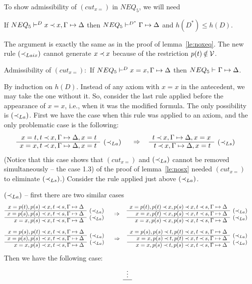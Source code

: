 \noindent
To show admissibility of $(cut_{x=})$ in $NEQ_5$, we will need
\begin{LEMMA}\label{le:xok}
If ${NEQ_5}\vdash^{{D}}x\mathbin{\prec} x,\Gamma\mathrel{\mapsto}\Delta$ then ${NEQ_5}\vdash^{{D^*}}\Gamma\mathrel{\mapsto}\Delta$ and $h(D^*)\leq h(D)$.
\end{LEMMA}
\begin{PROOF}
The argument is exactly the same as in the proof of lemma~\ref{le:noxeq}. The new rule
$(\mathbin{\prec}_{Laix})$ cannot generate $x\mathbin{\prec} x$ because of the restriction $p(t)\not\in\Vars$.
\end{PROOF}


\begin{LEMMA}\label{le:noxx}\label{le:nocutx}
Admissibility of $(cut_{x=}):$ 
If ${NEQ_5}\vdash^{{D}}x=x,\Gamma\mathrel{\mapsto}\Delta$ then ${NEQ_5}\vdash^{{}}\Gamma\mathrel{\mapsto}\Delta$.
\end{LEMMA}
\begin{PROOF} 
By induction on $h(D)$. 
Instead of any axiom with $x=x$ in the antecedent, we may
take the one without it. 
So, consider the last rule applied before the appearance
of $x=x$, i.e., when it was the modified formula. 
The only possibility is $(\mathbin{\prec}_{La})$.
 First we have the case when this rule was applied to an axiom,
and the only problematic case is the following:
\[
\prarc{
x=t, t\Incl x,\GSD,x=t \cl
x=x, t\Incl x,\GSD,x=t& \rabove{\iLa} 
}\conv
\prarc{
t\Incl x,\GSD,x=x  \cl 
t\Incl x,\GSD,x=t & \rabove{\iLs} 
}
\]
(Notice that this case shows that $(cut_{x=})$ and $(\mathbin{\prec}_{Ls})$ cannot be removed
simultaneously -- the case 1.3) of the proof of lemma~\ref{le:nosx} needed $(cut_{x=})$
to eliminate $(\mathbin{\prec}_{Ls})$.)
Consider the rule applied just above $(\mathbin{\prec}_{La})$.
\begin{LS}
\item $(\mathbin{\prec}_{La})$ -- first there are two similar cases
\[\prarc{
x=p(t), p(s)\Incl x, t\Incl s, \GSD \cl
x=p(s), p(s)\Incl x, t\Incl s, \GSD & \rabove{\iLa} \cl
x=x, p(s)\Incl x, t\Incl s, \GSD & \rabove{\iLa} 
}\conv
\prarc{
x=p(t), p(t)\Incl x, p(s)\Incl x, t\Incl s, \GSD \cl
x=x, p(t)\Incl x, p(s)\Incl x, t\Incl s, \GSD & \rabove{\iLa} \cl
x=x, p(s)\Incl x, p(s)\Incl x, t\Incl s, \GSD & \rabove{\iLa} 
}
\]
\[\prarc{
x=p(s), p(t)\Incl x, t\Incl s, \GSD \cl
x=p(s), p(s)\Incl x, t\Incl s, \GSD & \rabove{\iLa} \cl
x=x, p(s)\Incl x, t\Incl s, \GSD & \rabove{\iLa} 
}\conv
\prarc{
x=p(s), p(s)\Incl t, p(t)\Incl x, t\Incl s, \GSD \cl
x=x, p(s)\Incl t, p(t)\Incl x, t\Incl s, \GSD & \rabove{\iLa} \cl
x=x, p(s)\Incl t, p(s)\Incl x, t\Incl s, \GSD & \rabove{\iLa} 
}
\]
Then we have the following case:
\[\prar{
\multicolumn{1}{c}{\vdots} \cl
}\]
\end{LS}
\end{PROOF}
